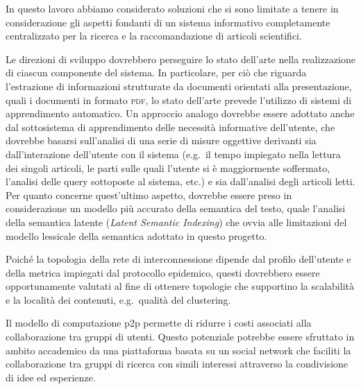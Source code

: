 In questo lavoro abbiamo considerato soluzioni che si sono limitate a tenere in considerazione gli aspetti fondanti di un sistema informativo completamente centralizzato per la ricerca e la raccomandazione di articoli scientifici.

Le direzioni di sviluppo dovrebbero perseguire lo stato dell'arte nella realizzazione di ciascun componente del sistema. In particolare, per ciò che riguarda l'estrazione di informazioni strutturate da documenti orientati alla presentazione, quali i documenti in formato \textsc{pdf}, lo stato dell'arte prevede l'utilizzo di sistemi di apprendimento automatico. Un approccio analogo dovrebbe essere adottato anche dal sottosistema di apprendimento delle necessità informative dell'utente, che dovrebbe basarsi sull'analisi di una serie di misure oggettive derivanti sia dall'interazione dell'utente con il sistema (e.g.\ il tempo impiegato nella lettura dei singoli articoli, le parti sulle quali l'utente si è maggiormente soffermato, l'analisi delle query sottoposte al sistema, etc.) e sia dall'analisi degli articoli letti. Per quanto concerne quest'ultimo aspetto, dovrebbe essere preso in considerazione un modello più accurato della semantica del testo, quale l'analisi della semantica latente (\textit{Latent Semantic Indexing}) che ovvia alle limitazioni del modello lessicale della semantica adottato in questo progetto.

Poiché la topologia della rete di interconnessione dipende dal profilo dell'utente e della metrica impiegati dal protocollo epidemico, questi dovrebbero essere opportunamente valutati al fine di ottenere topologie che supportino la scalabilità e la località dei contenuti, e.g.\ qualità del clustering.

Il modello di computazione p2p permette di ridurre i costi associati alla collaborazione tra gruppi di utenti. Questo potenziale potrebbe essere sfruttato in ambito accademico da una piattaforma basata su un social network che faciliti la collaborazione tra gruppi di ricerca con simili interessi attraverso la condivisione di idee ed esperienze.
